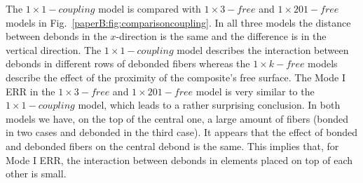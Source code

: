 The $1\times 1-coupling$ model is compared with $1\times 3-free$ and $1\times 201-free$ models in Fig.~\ref{paperB:fig:comparisoncoupling}. In all three models the distance between debonds in the $x$-direction is the same and the difference is in the vertical direction. The $1\times 1-coupling$ model describes the interaction between debonds in different rows of debonded fibers whereas the $1\times k-free$ models describe the effect of the proximity of the composite's free surface. The Mode I ERR in the $1\times 3-free$ and $1\times 201-free$ model is very similar to the $1\times 1-coupling$ model, which leads to a rather surprising conclusion. In both models we have, on the top of the central one, a large amount of fibers (bonded in two cases and debonded in the third case). It appears that the effect of bonded and debonded fibers on the central debond is the same. This implies that, for Mode I ERR, the interaction between debonds in elements placed on top of each other is small.

